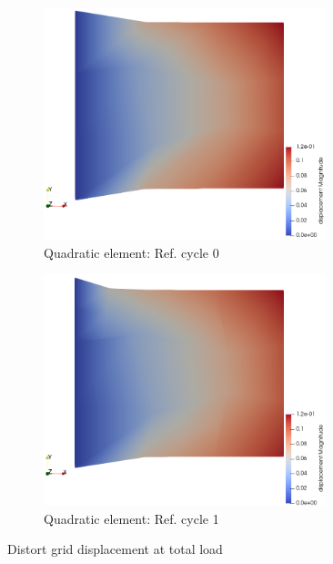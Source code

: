 \documentclass[11pt,a4paper,final]{article}
\begin{document}
\begin{figure}[h]
\begin{subfigure}[b]{0.35\textwidth}
\includegraphics[width=0.9\textwidth]{patch_distort_grid_ref_0_quad.png}
\caption{Quadratic element: Ref. cycle 0}
\label{fig:1.2.3}
\end{subfigure}
\begin{subfigure}[b]{0.35\textwidth}
\centering
\includegraphics[width=0.9\textwidth]{patch_distort_grid_ref_1_quad.png}
\caption{Quadratic element: Ref. cycle 1}
\label{fig:1.2.4}
\end{subfigure}
\caption{Distort grid displacement at total load}
\label{fig:1.2}
\end{figure}
\end{document}
